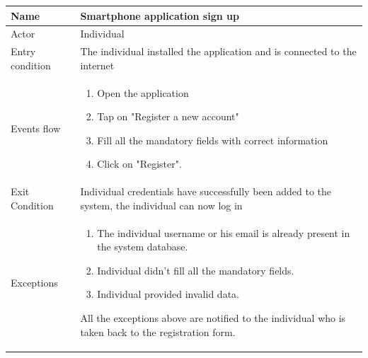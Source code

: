 \begin{table}[p]
\centering
\begin{tabular}{|l|p{11cm}|}
    \hline
    Name & Smartphone application sign up
    \\ \hline
    Actor & Individual
    \\ \hline 
    Entry condition & The individual installed the application and is connected to the internet
    \\ \hline
    Events flow &
    \begin{enumerate}
    \item Open the application
    \item Tap on "Register a new account"
    \item Fill all the mandatory fields with correct information
    \item Click on "Register".
    \end{enumerate}
     \\ \hline
     Exit Condition & Individual credentials have successfully been added to the system,
     the individual can now log in     
     \\
    \hline
    Exceptions &
        \begin{enumerate}
    \item The individual username or his email is already present in the system database.
    \item Individual didn't fill all the mandatory fields.
    \item Individual provided invalid data.
    \end{enumerate}
    All the exceptions above are notified to the individual who is taken back to the registration form.
      \\
    \hline
\end{tabular}
\end{table}

